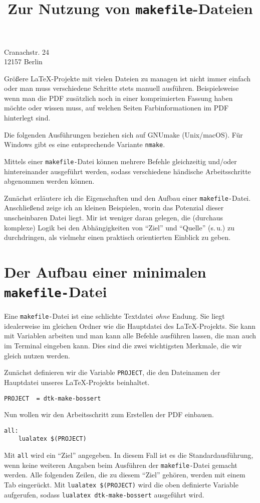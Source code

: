 \documentclass[ngerman]{dtk}
\begin{document}
\title{Zur Nutzung von \texttt{makefile}-Dateien}
%
{Cranachstr. 24\\
12157 Berlin\\
}
\maketitle

Größere \LaTeX -Projekte mit vielen Dateien zu managen ist nicht immer einfach
oder man muss verschiedene Schritte stets manuell ausführen.
Beispielsweise wenn man die PDF zusätzlich noch in einer komprimierten
Fassung haben möchte oder wissen muss, auf welchen Seiten Farbinformationen im PDF
hinterlegt sind.

Die folgenden Ausführungen beziehen sich auf GNUmake (Unix/macOS).
Für Windows gibt es eine entsprechende Variante \texttt{nmake}.


Mittels einer \texttt{makefile-}Datei können mehrere Befehle gleichzeitig und/oder
hintereinander ausgeführt werden, sodass verschiedene händische Arbeitsschritte abgenommen werden können.

Zunächst erläutere ich die Eigenschaften und den Aufbau einer \texttt{makefile-}Datei.
Anschließend zeige ich an kleinen Beispielen,
worin das Potenzial dieser unscheinbaren Datei liegt.
Mir ist weniger daran gelegen,
die (durchaus komplexe) Logik bei den Abhängigkeiten von \enquote{Ziel}
und \enquote{Quelle} (s.\,u.) zu durchdringen,
als vielmehr einen praktisch orientierten Einblick zu geben.

\section{Der Aufbau einer minimalen \texttt{makefile-}Datei}
Eine \texttt{makefile-}Datei ist eine schlichte Textdatei \emph{ohne} Endung.
Sie liegt idealerweise im gleichen Ordner wie die Hauptdatei des \LaTeX -Projekts.
Sie kann mit Variablen arbeiten und man kann alle Befehle ausführen lassen,
die man auch im Terminal eingeben kann.
Dies sind die zwei wichtigsten Merkmale,
die wir gleich nutzen werden.

Zunächst definieren wir die Variable \texttt{PROJECT},
die den Dateinamen der Hauptdatei unseres \LaTeX -Projekts beinhaltet.
\begin{lstlisting}[style=number]
PROJECT  = dtk-make-bossert
\end{lstlisting}

Nun wollen wir den Arbeitsschritt zum Erstellen der PDF einbauen.
\begin{lstlisting}[style=number]
all:
    lualatex $(PROJECT)
\end{lstlisting}
Mit \texttt{all} wird ein \enquote{Ziel} angegeben.
In diesem Fall ist es die Standardausführung,
wenn keine weiteren Angaben beim Ausführen der
\texttt{makefile-}Datei gemacht werden.
Alle folgenden Zeilen, die zu diesem \enquote{Ziel} gehören,
werden mit einem Tab eingerückt.
Mit \texttt{lualatex \$(PROJECT)} wird die oben definierte
Variable aufgerufen, sodass \texttt{lualatex dtk-make-bossert}
ausgeführt wird.
\end{document}
